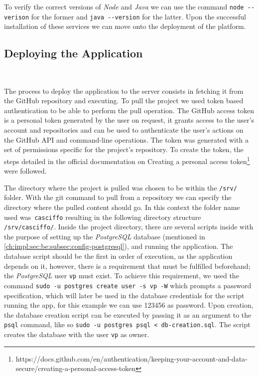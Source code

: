 To verify the correct versions of \textit{Node} and \textit{Java} we can use the command \lstinline{node --verison} for the former and \lstinline{java --version} for the latter.
Upon the successful installation of these services we can move onto the deployment of the platform.

\subsection{Deploying the Application}~\label{ch:impl:sec:install-deploy:ss:on-premises:ss:deploy-app}

The process to deploy the application to the server consists in fetching it from the GitHub repository and executing.
To pull the project we used token based authentication to be able to perform the pull operation. The GitHub access token is a personal token generated by the user on request, it grants access to the user's account and repositories and can be used to authenticate the user's actions on the GitHub API and command-line operations. The token was generated with a set of permissions specific for the project's repository. To create the token, the steps detailed in the official documentation on Creating a personal access token\footnote{https://docs.github.com/en/authentication/keeping-your-account-and-data-secure/creating-a-personal-access-token}~\label{fn:github-personal-token} were followed.

The directory where the project is pulled was chosen to be within the \lstinline{/srv/} folder. With the git command to pull from a repository we can specify the directory where the pulled content should go. In this context the folder name used was~\lstinline{casciffo} resulting in the following directory structure \lstinline{/srv/casciffo/}.
Inside the project directory, there are several scripts inside with the purpose of setting up the \textit{PostgreSQL} database (mentioned in \cref{ch:impl:sec:be:subsec:config-postgresql}), and running the application.
The database script should be the first in order of execution, as the application depends on it, however, there is a requirement that must be fulfilled beforehand; the \textit{PostgreSQL} user \texttt{vp} must exist.
To achieve this requirement, we used the command \lstinline{sudo -u postgres create user -s vp -W} which prompts a password specification, which will later be used in the database credentials for the script running the app, for this example we can use 123456 as password. Upon creation, the database creation script can be executed by passing it as an argument to the \lstinline{psql} command, like so \lstinline{sudo -u postgres psql < db-creation.sql}. The script creates the database with the user \texttt{vp} as owner.


